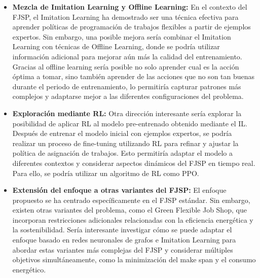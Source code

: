 \begin{itemize}
    \item \textbf{Mezcla de Imitation Learning y Offline Learning:} En 
    el contexto del FJSP, el Imitation Learning ha demostrado ser una 
    técnica efectiva para aprender políticas de programación de trabajos 
    flexibles a partir de ejemplos expertos. Sin embargo, una posible mejora 
    sería combinar el Imitation Learning con técnicas de Offline Learning, 
    donde se podría utilizar información adicional para mejorar aún más la 
    calidad del entrenamiento. Gracias al offline learning sería posible no 
    solo aprender cual es la acción óptima a tomar, sino también aprender 
    de las acciones que no son tan buenas durante el periodo de entrenamiento, 
    lo permitiría capturar patrones más complejos y adaptarse mejor a las 
    diferentes configuraciones del problema.
   \item \textbf{Exploración mediante RL:} Otra dirección interesante sería explorar 
   la posibilidad de aplicar RL al modelo pre-entrenado obtenido mediante 
   el IL. Después de entrenar el modelo inicial con ejemplos expertos, 
   se podría realizar un proceso de fine-tuning utilizando RL para refinar 
   y ajustar la política de asignación de trabajos. Esto permitiría adaptar 
   el modelo a diferentes contextos y considerar aspectos dinámicos del 
   FJSP en tiempo real. Para ello, se podría utilizar un algoritmo de
   RL como PPO.
   \item \textbf{Extensión del enfoque a otras variantes del FJSP:} El 
   enfoque propuesto se ha centrado específicamente en el FJSP estándar. 
   Sin embargo, existen otras variantes del problema, como el Green Flexible 
   Job Shop, que incorporan restricciones adicionales relacionadas con la 
   eficiencia energética y la sostenibilidad. Sería interesante investigar 
   cómo se puede adaptar el enfoque basado en redes neuronales de grafos e 
   Imitation Learning para abordar estas variantes más complejas del FJSP y 
   considerar múltiples objetivos simultáneamente, como la minimización del 
   make span y el consumo energético.


\end{itemize}